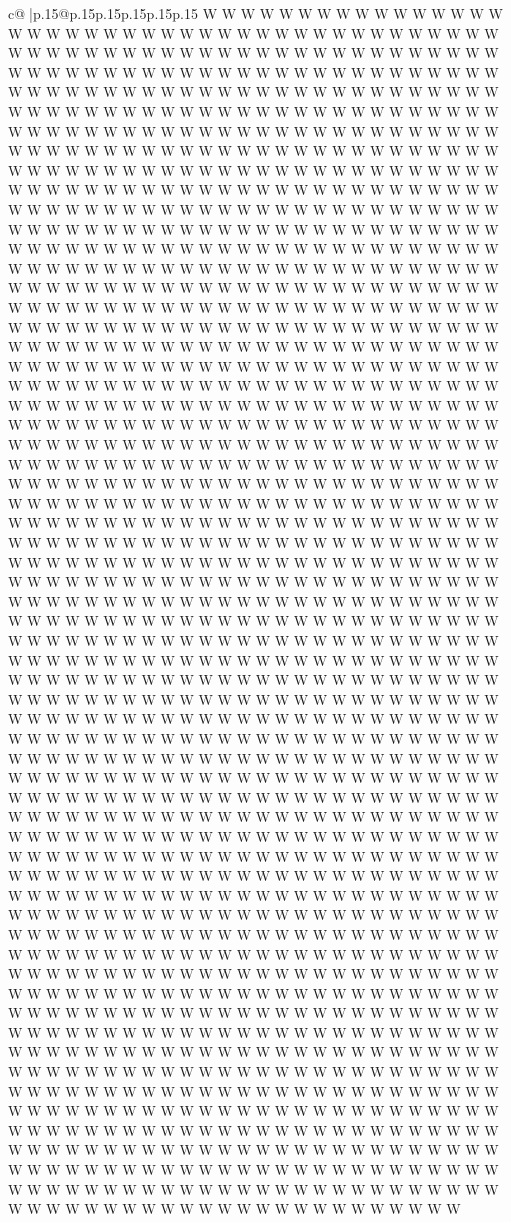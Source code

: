 \documentclass{article}
\begin{document}
{\begin{supertabular}{c@{$\;$}|p{.15\linewidth}@{}p{.15\linewidth}p{.15\linewidth}p{.15\linewidth}p{.15\linewidth}p{.15\linewidth}}
{{{W W W W W W W W W W W W W W W W W W W W W W W W W W W W W W W W W W W W W W W W W W W W W W W W W W W W W W W W W W W W W W W W W W W W W W W W W W W W W W W W W W W W W W W W W W W W W W W W W W W W W W W W W W W W W W W W W W W W W W W W W W W W W W W W W W W W W W W W W W W W W W W W W W W W W W W W W W W W W W W W W W W W W W W W W W W W W W W W W W W W W W W W W W W W W W W W W W W W W W W W W W W W W W W W W W W W W W W W W W W W W W W W W W W W W W W W W W W W W W W W W W W W W W W W W W W W W W W W W W W W W W W W W W W W W W W W W W W W W W W W W W W W W W W W W W W W W W W W W W W W W W W W W W W W W W W W W W W W W W W W W W W W W W W W W W W W W W W W W W W W W W W W W W W W W W W W W W W W W W W W W W W W W W W W W W W W W W W W W W W W W W W W W W W W W W W W W W W W W W W W W W W W W W W W W W W W W W W W W W W W W W W W W W W W W W W W W W W W W W W W W W W W W W W W W W W W W W W W W W W W W W W W W W W W W W W W W W W W W W W W W W W W W W W W W W W W W W W W W W W W W W W W W W W W W W W W W W W W W W W W W W W W W W W W W W W W W W W W W W W W W W W W W W W W W W W W W W W W W W W W W W W W W W W W W W W W W W W W W W W W W W W W W W W W W W W W W W W W W W W W W W W W W W W W W W W W W W W W W W W W W W W W W W W W W W W W W W W W W W W W W W W W W W W W W W W W W W W W W W W W W W W W W W W W W W W W W W W W W W W W W W W W W W W W W W W W W W W W W W W W W W W W W W W W W W W W W W W W W W W W W W W W W W W W W W W W W W W W W W W W W W W W W W W W W W W W W W W W W W W W W W W W W W W W W W W W W W W W W W W W W W W W W W W W W W W W W W W W W W W W W W W W W W W W W W W W W W W W W W W W W W W W W W W W W W W W W W W W W W W W W W W W W W W W W W W W W W W W W W W W W W W W W W W W W W W W W W W W W W W W W W W W W W W W W W W W W W W W W W W W W W W W W W W W W W W W W W W W W W W W W W W W W W W W W W W W W W W W W W W W W W W W W W W W W W W W W W W W W W W W W W W W W W W W W W W W W W W W W W W W W W W W W W W W W W W W W W W W W W W W W W W W W W W W W W W W W W W W W W W W W W W W W W W W W W W W W W W W W W W W W W W W W W W W W W W W W W W W W W W W W W W W W W W W W W W W W W W W W W W W W W W W W W W W W W W W W W W W W W W W W W W W W W W W W W W W W W W W W W W W W W W W W W W W W W W W W W W W W W W W W W W W W W W W W W W W W W W W W W W W W W W W W W W W W W W W W W W W W W W W W W W W W W W W W W W W W W W W W W W W W W W W W W W W W W W W W W W W W W W W W W W W W W W W W W W W W W W W W W W W W W W W W W W W W W W W W W W W W W W W W W W W W W W W W W W W W W W W W W W W W W W W W W W W W W W W W W W W W W W W W W W W W W W W W W W W W W W W W W W W W W W W W W W W W W W W W W W W W W W W W W W W W W W W W W W W W W W W W W W W W W W W W W W W W W W W W W W W W W W W W W W W W W W W W W W W W W W W W W W W W W W W W W W W W W W W W W W W W W W W W W W W W W W W W W W W W W W W W W W W W W W W W W W W W W W W W W W W W W W W W W W W W W W W W W W W W W W W W W W W W W W W W W W W W W W W W W W W W W W W W W W W W W W W W W W W W W W W W W W W W W W W W W W W W W W W W W W W W W W W W W W W W W W W W W W W W W W W W W W W W W W W W W W W W W W W W W W W W W W W W W W W W W W W W W W W W W W W W W W W }}}
\end{supertabular}}
\end{document}
